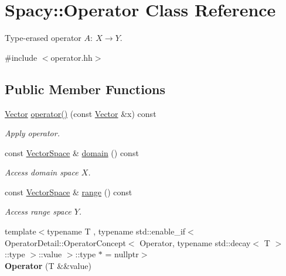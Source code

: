 \hypertarget{classSpacy_1_1Operator}{}\section{Spacy\+:\+:Operator Class Reference}
\label{classSpacy_1_1Operator}


Type-\/erased operator $A:\ X \to Y $.  




{\ttfamily \#include $<$operator.\+hh$>$}

\subsection*{Public Member Functions}
\begin{DoxyCompactItemize}
\item 
\hyperlink{classSpacy_1_1Vector}{Vector} \hyperlink{classSpacy_1_1Operator_a2ab6072d6f9d98e0d5590531c080e3ad}{operator()} (const \hyperlink{classSpacy_1_1Vector}{Vector} \&x) const \hypertarget{classSpacy_1_1Operator_a2ab6072d6f9d98e0d5590531c080e3ad}{}\label{classSpacy_1_1Operator_a2ab6072d6f9d98e0d5590531c080e3ad}

\begin{DoxyCompactList}\small\item\em Apply operator. \end{DoxyCompactList}\item 
const \hyperlink{classSpacy_1_1VectorSpace}{Vector\+Space} \& \hyperlink{classSpacy_1_1Operator_a3b3d457bee48adf00d683a6aec4aa841}{domain} () const \hypertarget{classSpacy_1_1Operator_a3b3d457bee48adf00d683a6aec4aa841}{}\label{classSpacy_1_1Operator_a3b3d457bee48adf00d683a6aec4aa841}

\begin{DoxyCompactList}\small\item\em Access domain space $X$. \end{DoxyCompactList}\item 
const \hyperlink{classSpacy_1_1VectorSpace}{Vector\+Space} \& \hyperlink{classSpacy_1_1Operator_a8cf3b1e3b6c5c6ab5ddc09224ed8ab24}{range} () const \hypertarget{classSpacy_1_1Operator_a8cf3b1e3b6c5c6ab5ddc09224ed8ab24}{}\label{classSpacy_1_1Operator_a8cf3b1e3b6c5c6ab5ddc09224ed8ab24}

\begin{DoxyCompactList}\small\item\em Access range space $Y$. \end{DoxyCompactList}\item 
{\footnotesize template$<$typename T , typename std\+::enable\+\_\+if$<$ Operator\+Detail\+::\+Operator\+Concept$<$ Operator, typename std\+::decay$<$ T $>$\+::type $>$\+::value $>$\+::type $\ast$  = nullptr$>$ }\\{\bfseries Operator} (T \&\&value)\hypertarget{classSpacy_1_1Operator_adfd4cdca1e6d705e9a52a6d3930c83d2}{}\label{classSpacy_1_1Operator_adfd4cdca1e6d705e9a52a6d3930c83d2}


\end{DoxyCompactItemize}
